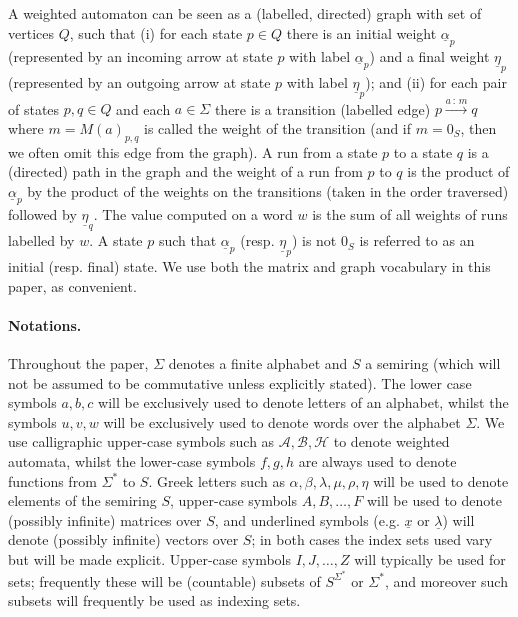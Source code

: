 \documentclass{lmcs}
\numberwithin{theorem}{section}
\begin{document}
A weighted automaton can be seen as a (labelled, directed) graph with set of vertices $Q$, such that (i) for each state $p \in Q$ there is an initial weight $\underline{\alpha}_p$ (represented by an incoming arrow at state $p$ with label $\underline{\alpha}_p$) and a final weight $\underline{\eta}_p$ (represented by an outgoing arrow at state $p$ with label $\underline{\eta}_p$); and (ii) for each pair of states $p,q \in Q$ and each $a \in \Sigma$ there is a transition (labelled edge) $p \xrightarrow{a\, : \, m} q$ where $m=M(a)_{p,q}$ is called the weight of the transition (and if $m=0_S$, then we often omit this edge from the graph). A run from a state $p$ to a state $q$ is a (directed) path in the graph and the weight of a run from $p$ to $q$ is the product of $\underline{\alpha}_p$  by the product of the weights on the transitions (taken in the order traversed) followed by $\underline{\eta}_q$. The value computed on a word $w$ is the sum of all weights of runs labelled by $w$. A state $p$ such that $\underline{\alpha}_p$ (resp. $\underline{\eta}_p$) is not $0_S$ is referred to as an initial (resp. final) state. We use both the matrix and graph vocabulary in this paper, as convenient.

\paragraph*{\textbf{Notations.}}
Throughout the paper, $\Sigma$ denotes a finite alphabet and $S$ a semiring (which will not be assumed to be commutative unless explicitly stated). The lower case symbols $a,b,c$ will be exclusively used to denote letters of an alphabet, whilst the symbols $u,v,w$ will be exclusively used to denote words over the alphabet $\Sigma$. We use calligraphic upper-case symbols such as $\mathcal{A}, \mathcal{B}, \mathcal{H}$ to denote weighted automata, whilst the lower-case symbols $f,g,h$ are always used to denote functions from $\Sigma^*$ to $S$.  Greek letters such as $\alpha, \beta, \lambda, \mu, \rho, \eta$ will be used to denote elements of the semiring $S$, upper-case symbols $A, B, \ldots, F$ will be used to denote (possibly infinite) matrices over $S$, and underlined symbols (e.g. $\underline{x}$ or $\underline{\lambda}$) will denote (possibly infinite) vectors over $S$; in both cases the index sets used  vary but will be made explicit. Upper-case symbols $I, J,\ldots, Z$ will typically be used for sets;  frequently these will be (countable) subsets of $S^{\Sigma^*}$ or $\Sigma^*$, and moreover such subsets will frequently be used as indexing sets.
\end{document}
